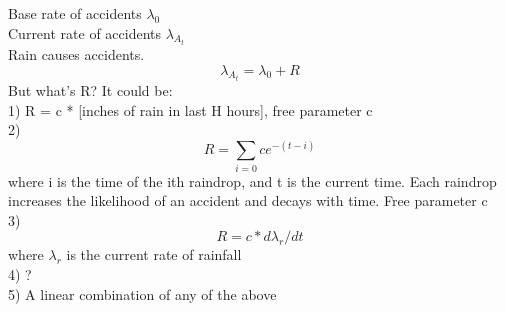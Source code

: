 \documentclass[12pt,fleqn,leqno,letterpaper]{article}
\begin{document}
Base rate of accidents $\lambda_0$\\
Current rate of accidents $\lambda_{A_t}$\\
Rain causes accidents.
$$\lambda_{A_t} = \lambda_0 + R
$$
But what's R? It could be:\\
1) R = c * [inches of rain in last H hours], free parameter c\\
2) $$R = \sum_{i=0} ce^{-(t-i)} $$ where i is the time of the ith raindrop, and t is the current time. Each raindrop increases the likelihood of an accident and decays with time. Free parameter c\\
3) $$R = c * d\lambda_r/dt$$ where $\lambda_r$ is the current rate of rainfall\\
4) ?\\
5) A linear combination of any of the above
\end{document}

